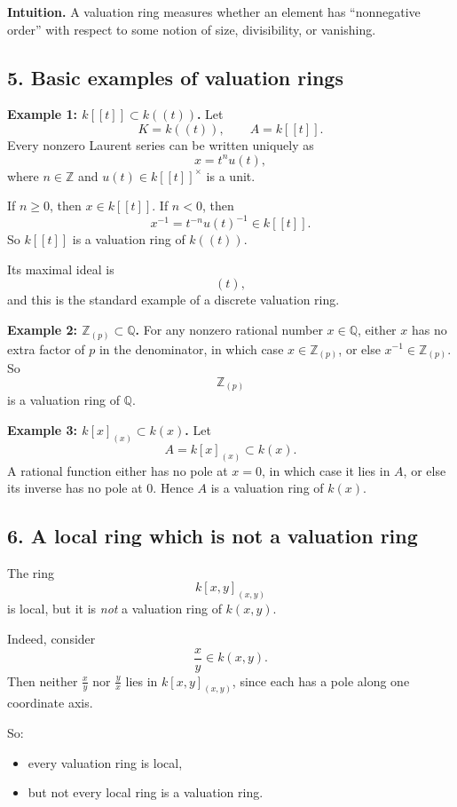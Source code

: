 \documentclass[12pt,a4paper]{article}
\theoremstyle{notespace}
\begin{document}
\textbf{Intuition.}
A valuation ring measures whether an element has ``nonnegative order'' with respect to some notion of size, divisibility, or vanishing.

\subsection{5. Basic examples of valuation rings}

\textbf{Example 1: \(k[[t]]\subset k((t))\).}
Let
\[
K=k((t)),
\qquad
A=k[[t]].
\]
Every nonzero Laurent series can be written uniquely as
\[
x=t^n u(t),
\]
where \(n\in \mathbb Z\) and \(u(t)\in k[[t]]^\times\) is a unit.

If \(n\ge 0\), then \(x\in k[[t]]\). If \(n<0\), then
\[
x^{-1}=t^{-n}u(t)^{-1}\in k[[t]].
\]
So \(k[[t]]\) is a valuation ring of \(k((t))\).

Its maximal ideal is
\[
(t),
\]
and this is the standard example of a discrete valuation ring.

\textbf{Example 2: \(\mathbb Z_{(p)}\subset \mathbb Q\).}
For any nonzero rational number \(x\in \mathbb Q\), either \(x\) has no extra factor of \(p\) in the denominator, in which case \(x\in \mathbb Z_{(p)}\), or else \(x^{-1}\in \mathbb Z_{(p)}\). So
\[
\mathbb Z_{(p)}
\]
is a valuation ring of \(\mathbb Q\).

\textbf{Example 3: \(k[x]_{(x)}\subset k(x)\).}
Let
\[
A=k[x]_{(x)} \subset k(x).
\]
A rational function either has no pole at \(x=0\), in which case it lies in \(A\), or else its inverse has no pole at \(0\). Hence \(A\) is a valuation ring of \(k(x)\).

\subsection{6. A local ring which is not a valuation ring}

The ring
\[
k[x,y]_{(x,y)}
\]
is local, but it is \emph{not} a valuation ring of \(k(x,y)\).

Indeed, consider
\[
\frac{x}{y}\in k(x,y).
\]
Then neither \(\frac{x}{y}\) nor \(\frac{y}{x}\) lies in \(k[x,y]_{(x,y)}\), since each has a pole along one coordinate axis.

So:
\begin{itemize}
	\item every valuation ring is local,
	\item but not every local ring is a valuation ring.
\end{itemize}
\end{document}

